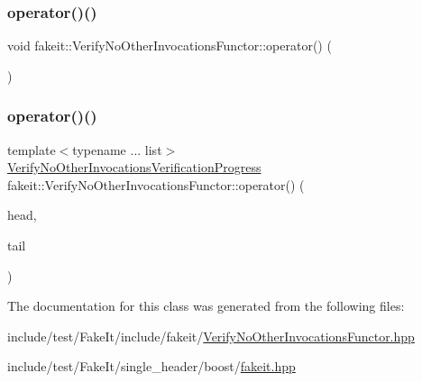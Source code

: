 \subsubsection{\texorpdfstring{operator()()}{operator()()}\hspace{0.1cm}{\footnotesize\ttfamily [17/18]}}
{\footnotesize\ttfamily void fakeit\+::\+Verify\+No\+Other\+Invocations\+Functor\+::operator() (\begin{DoxyParamCaption}{ }\end{DoxyParamCaption})\hspace{0.3cm}{\ttfamily [inline]}}

\mbox{\label{classfakeit_1_1VerifyNoOtherInvocationsFunctor_a6f43e7d3b976534fa8f22abfad04004a}} 
\subsubsection{\texorpdfstring{operator()()}{operator()()}\hspace{0.1cm}{\footnotesize\ttfamily [18/18]}}
{\footnotesize\ttfamily template$<$typename ... list$>$ \\
\mbox{\hyperlink{classfakeit_1_1VerifyNoOtherInvocationsVerificationProgress}{Verify\+No\+Other\+Invocations\+Verification\+Progress}} fakeit\+::\+Verify\+No\+Other\+Invocations\+Functor\+::operator() (\begin{DoxyParamCaption}\item[{const \mbox{\hyperlink{structfakeit_1_1ActualInvocationsSource}{Actual\+Invocations\+Source}} \&}]{head,  }\item[{const list \&...}]{tail }\end{DoxyParamCaption})\hspace{0.3cm}{\ttfamily [inline]}}



The documentation for this class was generated from the following files\+:\begin{DoxyCompactItemize}
\item 
include/test/\+Fake\+It/include/fakeit/\mbox{\hyperlink{VerifyNoOtherInvocationsFunctor_8hpp}{Verify\+No\+Other\+Invocations\+Functor.\+hpp}}\item 
include/test/\+Fake\+It/single\+\_\+header/boost/\mbox{\hyperlink{single__header_2boost_2fakeit_8hpp}{fakeit.\+hpp}}\end{DoxyCompactItemize}
